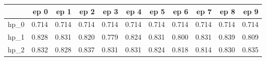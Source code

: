 \begin{tabular}{lrrrrrrrrrr}
\toprule
{} &   ep 0 &   ep 1 &   ep 2 &   ep 3 &   ep 4 &   ep 5 &   ep 6 &   ep 7 &   ep 8 &   ep 9 \\
\midrule
hp\_0 &  0.714 &  0.714 &  0.714 &  0.714 &  0.714 &  0.714 &  0.714 &  0.714 &  0.714 &  0.714 \\
hp\_1 &  0.828 &  0.831 &  0.820 &  0.779 &  0.824 &  0.831 &  0.800 &  0.831 &  0.839 &  0.809 \\
hp\_2 &  0.832 &  0.828 &  0.837 &  0.831 &  0.831 &  0.824 &  0.818 &  0.814 &  0.830 &  0.835 \\
\bottomrule
\end{tabular}
